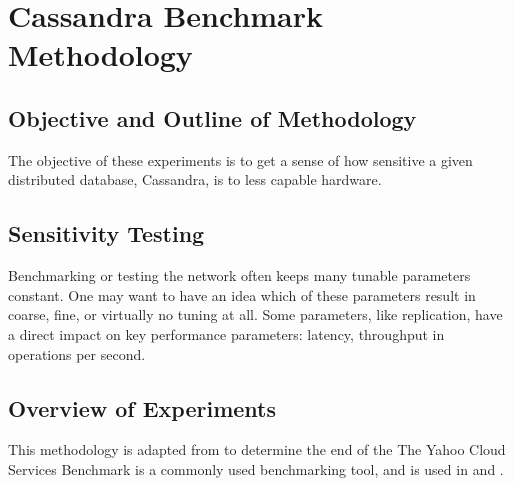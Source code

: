
\chapter{Cassandra Benchmark Methodology} %

\label{Methodology}
\label{Chapter3}

\section{Objective and Outline of Methodology}

The objective of these experiments is to get a sense of how sensitive a given distributed database, Cassandra, is to less capable hardware.








\section{Sensitivity Testing}

Benchmarking or testing the network often keeps many tunable parameters constant.
One may want to have an idea which of these parameters result in coarse, fine, or virtually no tuning at all.
Some parameters, like replication, have a direct impact on key performance parameters: latency, throughput in operations per second.

\section{Overview of Experiments}

This methodology is adapted from \cite{Abramova2014TestingCassandra} to determine the end of the 
The Yahoo Cloud Services Benchmark \cite{YahooBenchmark} is a commonly used benchmarking tool, and is used in \cite{Abramova2013NoSQLCassandra} and \cite{Abramova2014TestingCassandra}.

